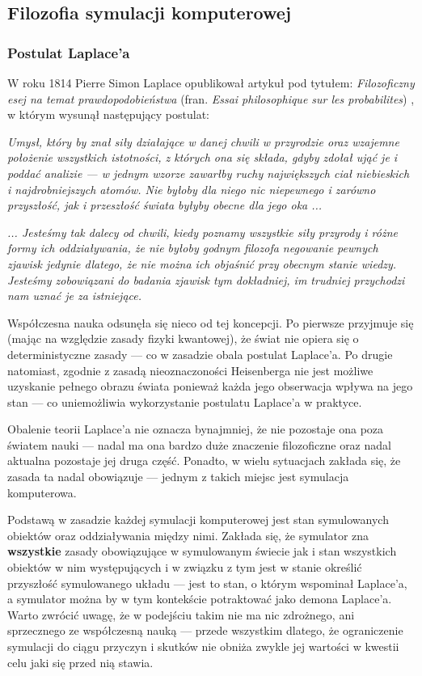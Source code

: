 \subsection{Filozofia symulacji komputerowej}

\subsubsection{Postulat Laplace'a}
\par{
W roku 1814 Pierre Simon Laplace opublikował artykuł pod tytułem: \textit{Filozoficzny esej na temat prawdopodobieństwa} (fran. \textit{Essai philosophique sur les probabilites}) \cite{Laplace}, w którym wysunął następujący postulat:
}
\par{
\textit{Umysł, który by znał siły działające w danej chwili w przyrodzie oraz wzajemne położenie wszystkich istotności, z których ona się składa, gdyby zdołał ująć je i poddać analizie --- w jednym wzorze zawarłby ruchy największych ciał niebieskich i najdrobniejszych atomów. Nie byłoby dla niego nic niepewnego i zarówno przyszłość, jak i przeszłość świata byłyby obecne dla jego oka ...
}}
\par{
\textit{... Jesteśmy tak dalecy od chwili, kiedy poznamy wszystkie siły przyrody i różne formy ich oddziaływania, że nie byłoby godnym filozofa negowanie pewnych zjawisk jedynie dlatego, że nie można ich objaśnić przy obecnym stanie wiedzy. Jesteśmy zobowiązani do badania zjawisk tym dokładniej, im trudniej przychodzi nam uznać je za istniejące.}
}

\par{
Współczesna nauka odsunęła się nieco od tej koncepcji. Po pierwsze przyjmuje się (mając na względzie zasady fizyki kwantowej), że świat nie opiera się o deterministyczne zasady --- co w zasadzie obala postulat Laplace'a. Po drugie natomiast, zgodnie z zasadą nieoznaczoności Heisenberga \cite{Heisenberg} nie jest możliwe uzyskanie pełnego obrazu świata ponieważ każda jego obserwacja wpływa na jego stan --- co uniemożliwia wykorzystanie postulatu Laplace'a w praktyce.
}
\par{
Obalenie teorii Laplace'a nie oznacza bynajmniej, że nie pozostaje ona poza światem nauki --- nadal ma ona bardzo duże znaczenie filozoficzne oraz nadal aktualna pozostaje jej druga część. Ponadto, w wielu sytuacjach zakłada się, że zasada ta nadal obowiązuje --- jednym z takich miejsc jest symulacja komputerowa.
}
\par{
Podstawą w zasadzie każdej symulacji komputerowej jest stan symulowanych obiektów oraz oddziaływania między nimi. Zakłada się, że symulator zna \textbf{wszystkie} zasady obowiązujące w symulowanym świecie jak i stan wszystkich obiektów w nim występujących i w związku z tym jest w stanie określić przyszłość symulowanego układu --- jest to stan, o którym wspominał Laplace'a, a symulator można by w tym kontekście potraktować jako demona Laplace'a. Warto zwrócić uwagę, że w podejściu takim nie ma nic zdrożnego, ani sprzecznego ze współczesną nauką --- przede wszystkim dlatego, że ograniczenie symulacji do ciągu przyczyn i skutków nie obniża zwykle jej wartości w kwestii celu jaki się przed nią stawia.
}


